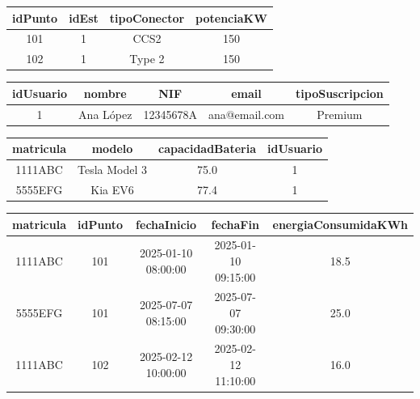\documentclass[10pt,a4paper,addpoints,answers]{exam}
\begin{document}
\begin{questions}
\vspace{1em}

\begin{tabular}{cccc}
\hline
\textbf{idPunto} & \textbf{idEst} & \textbf{tipoConector} & \textbf{potenciaKW} \\ \hline
101	             & 1              & CCS2                  & 150                 \\ \hline
102	             & 1              & Type 2                & 150                 \\ \hline
\end{tabular}

\vspace{1em}

\begin{tabular}{ccccc}
\hline
\textbf{idUsuario} & \textbf{nombre} & \textbf{NIF} & \textbf{email} & \textbf{tipoSuscripcion} \\ \hline
1                  & Ana López       & 12345678A    & ana@email.com  & Premium                  \\ \hline
\end{tabular}

\vspace{1em}

\begin{tabular}{cccc}
\hline
\textbf{matricula} & \textbf{modelo} & \textbf{capacidadBateria} & \textbf{idUsuario} \\ \hline
1111ABC            & Tesla Model 3   & 75.0                      & 1                  \\ \hline
5555EFG            & Kia EV6         & 77.4                      & 1                  \\ \hline
\end{tabular}

\vspace{1em}

\begin{tabular}{ccccc}
\hline
\textbf{matricula} & \textbf{idPunto} & \textbf{fechaInicio} & \textbf{fechaFin}   & \textbf{energiaConsumidaKWh} \\ \hline
1111ABC            & 101              & 2025-01-10 08:00:00  & 2025-01-10 09:15:00 & 18.5                         \\ \hline
5555EFG            & 101              & 2025-07-07 08:15:00  & 2025-07-07 09:30:00 & 25.0                         \\ \hline
1111ABC            & 102              & 2025-02-12 10:00:00  & 2025-02-12 11:10:00 & 16.0                         \\ \hline
\end{tabular}


\end{questions}
\end{document}
